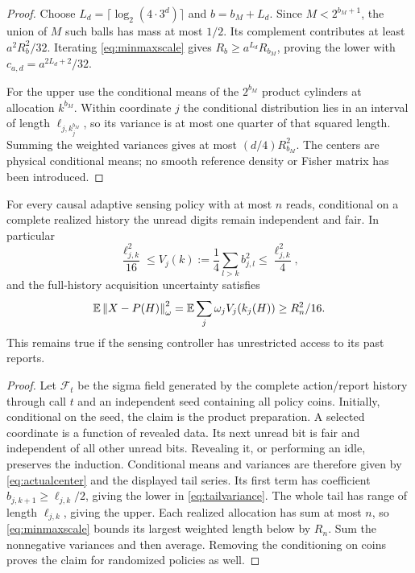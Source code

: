 \begin{proof}
Choose $L_d=\lceil\log_2(4\cdot3^d)\rceil$ and $b=b_M+L_d$. Since $M<2^{b_M+1}$, the union of $M$ such balls has mass at most $1/2$. Its complement contributes at least $a^2R_b^2/32$. Iterating \eqref{eq:minmaxscale} gives $R_b\ge a^{L_d}R_{b_M}$, proving the lower with $c_{a,d}=a^{2L_d+2}/32$.

For the upper use the conditional means of the $2^{b_M}$ product cylinders at allocation $k^{b_M}$. Within coordinate $j$ the conditional distribution lies in an interval of length $\ell_{j,k_j^{b_M}}$, so its variance is at most one quarter of that squared length. Summing the weighted variances gives at most $(d/4)R_{b_M}^2$. The centers are physical conditional means; no smooth reference density or Fisher matrix has been introduced.
\end{proof}

\begin{lemma}\label{lem:acquisition}
For every causal adaptive sensing policy with at most $n$ reads, conditional on a complete realized history the unread digits remain independent and fair. In particular
\begin{equation}\label{eq:tailvariance}
 \frac{\ell_{j,k}^2}{16}\le
 V_j(k):=\frac14\sum_{l>k}b_{j,l}^2
 \le\frac{\ell_{j,k}^2}{4},
\end{equation}
and the full-history acquisition uncertainty satisfies
\begin{equation}\label{eq:adaptivelower}
 \mathbb E\left\lVert X-P(H)\right\rVert_\omega^2
   =\mathbb E\sum_j\omega_j V_j(k_j(H))\ge R_n^2/16.
\end{equation}
This remains true if the sensing controller has unrestricted access to its past reports.
\end{lemma}
\begin{proof}
Let $\mathcal F_t$ be the sigma field generated by the complete action/report history through call $t$ and an independent seed containing all policy coins. Initially, conditional on the seed, the claim is the product preparation. A selected coordinate is a function of revealed data. Its next unread bit is fair and independent of all other unread bits. Revealing it, or performing an idle, preserves the induction. Conditional means and variances are therefore given by \eqref{eq:actualcenter} and the displayed tail series. Its first term has coefficient $b_{j,k+1}\ge\ell_{j,k}/2$, giving the lower in \eqref{eq:tailvariance}. The whole tail has range of length $\ell_{j,k}$, giving the upper. Each realized allocation has sum at most $n$, so \eqref{eq:minmaxscale} bounds its largest weighted length below by $R_n$. Sum the nonnegative variances and then average. Removing the conditioning on coins proves the claim for randomized policies as well.
\end{proof}

